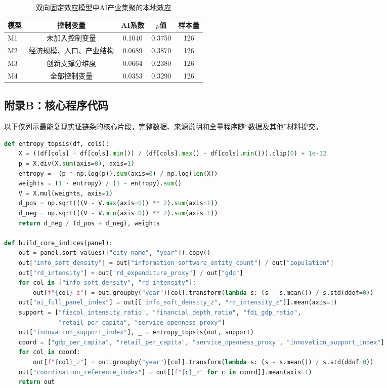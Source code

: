 \documentclass[12pt, a4paper]{ctexart}
\newcommand{\tablebodyformat}{\zihao{5}\setlength{\tabcolsep}{5pt}\renewcommand{\arraystretch}{1.2}}
\begin{document}
\begin{table}[htbp]
\centering
\caption{双向固定效应模型中AI产业集聚的本地效应}
\label{tab:twfe-ai-local}
{\tablebodyformat
\begin{tabular}{lcccc}
\toprule
模型 & 控制变量 & AI系数 & $p$值 & 样本量 \\
\midrule
M1 & 未加入控制变量 & 0.1040 & 0.3750 & 126 \\
M2 & 经济规模、人口、产业结构 & 0.0689 & 0.3870 & 126 \\
M3 & 创新支撑分维度 & 0.0664 & 0.2380 & 126 \\
M4 & 全部控制变量 & 0.0353 & 0.3290 & 126 \\
\bottomrule
\end{tabular}
}
\end{table}



\clearpage
\subsection*{附录B：核心程序代码}
以下仅列示最能复现实证链条的核心片段，完整数据、来源说明和全量程序随“数据及其他”材料提交。

\begin{lstlisting}[language=Python,basicstyle=\ttfamily\scriptsize]
def entropy_topsis(df, cols):
    X = ((df[cols] - df[cols].min()) / (df[cols].max() - df[cols].min())).clip(0) + 1e-12
    p = X.div(X.sum(axis=0), axis=1)
    entropy = -(p * np.log(p)).sum(axis=0) / np.log(len(X))
    weights = (1 - entropy) / (1 - entropy).sum()
    V = X.mul(weights, axis=1)
    d_pos = np.sqrt(((V - V.max(axis=0)) ** 2).sum(axis=1))
    d_neg = np.sqrt(((V - V.min(axis=0)) ** 2).sum(axis=1))
    return d_neg / (d_pos + d_neg), weights

def build_core_indices(panel):
    out = panel.sort_values(["city_name", "year"]).copy()
    out["info_soft_density"] = out["information_software_entity_count"] / out["population"]
    out["rd_intensity"] = out["rd_expenditure_proxy"] / out["gdp"]
    for col in ["info_soft_density", "rd_intensity"]:
        out[f"{col}_z"] = out.groupby("year")[col].transform(lambda s: (s - s.mean()) / s.std(ddof=0))
    out["ai_full_panel_index"] = out[["info_soft_density_z", "rd_intensity_z"]].mean(axis=1)
    support = ["fiscal_intensity_ratio", "financial_depth_ratio", "fdi_gdp_ratio",
               "retail_per_capita", "service_openness_proxy"]
    out["innovation_support_index"], _ = entropy_topsis(out, support)
    coord = ["gdp_per_capita", "retail_per_capita", "service_openness_proxy", "innovation_support_index"]
    for col in coord:
        out[f"{col}_z"] = out.groupby("year")[col].transform(lambda s: (s - s.mean()) / s.std(ddof=0))
    out["coordination_reference_index"] = out[[f"{c}_z" for c in coord]].mean(axis=1)
    return out
\end{lstlisting}
\end{document}
